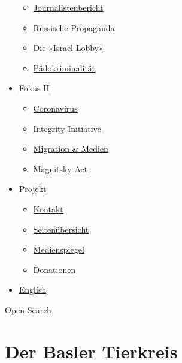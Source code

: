 \begin{itemize}
  \begin{itemize}
  \tightlist
  \item
    \href{https://swprs.org/bericht-eines-journalisten/}{Journalistenbericht}
  \item
    \href{https://swprs.org/russische-propaganda/}{Russische Propaganda}
  \item
    \href{https://swprs.org/die-israel-lobby-fakten-und-mythen/}{Die
    »Israel-Lobby«}
  \item
    \href{https://swprs.org/geopolitik-und-paedokriminalitaet/}{Pädokriminalität}
  \end{itemize}
\item
  \href{https://swprs.org/migration-und-medien/}{Fokus II}

  \begin{itemize}
  \tightlist
  \item
    \href{https://swprs.org/covid-19-hinweis-ii/}{Coronavirus}
  \item
    \href{https://swprs.org/die-integrity-initiative/}{Integrity
    Initiative}
  \item
    \href{https://swprs.org/migration-und-medien/}{Migration \& Medien}
  \item
    \href{https://swprs.org/der-fall-magnitsky/}{Magnitsky Act}
  \end{itemize}
\item
  \href{https://swprs.org/kontakt/}{Projekt}

  \begin{itemize}
  \tightlist
  \item
    \href{https://swprs.org/kontakt/}{Kontakt}
  \item
    \href{https://swprs.org/uebersicht/}{Seitenübersicht}
  \item
    \href{https://swprs.org/medienspiegel/}{Medienspiegel}
  \item
    \href{https://swprs.org/donationen/}{Donationen}
  \end{itemize}
\item
  \href{https://swprs.org/contact/}{English}
\end{itemize}

\protect\hyperlink{}{Open Search}

\hypertarget{der-basler-tierkreis}{%
\section{Der Basler Tierkreis}\label{der-basler-tierkreis}}

